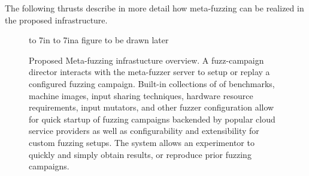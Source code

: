 The following thrusts describe in more detail how meta-fuzzing can be realized 
in the proposed infrastructure.


\begin{figure}[htbp!]
\vbox to 7in {\vfil
\hbox to 7in{a figure to be drawn later}%
\vfil
}

\caption{Proposed Meta-fuzzing infrastucture overview.  
A fuzz-campaign director interacts with the meta-fuzzer server to setup or replay a configured fuzzing campaign.  
Built-in collections of of benchmarks, machine images, input sharing techniques, hardware resource requirements, input mutators, and other fuzzer configuration 
allow for quick startup of fuzzing campaigns backended by popular cloud service providers as well as configurability and extensibility for custom fuzzing setups.  
The system allows an experimentor to quickly and simply obtain results, or reproduce prior fuzzing campaigns.}
\label{fig:overview}
\end{figure}



